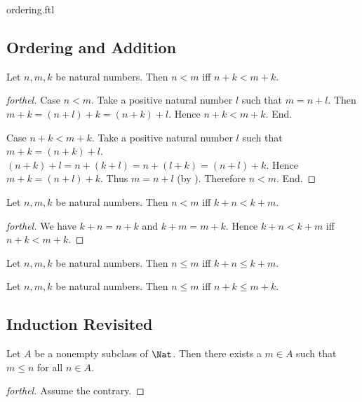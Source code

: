 \documentclass{naproche-library}
\begin{document}
\begin{smodule}{ordering.ftl}
  \subsection*{Ordering and Addition}

  \begin{proposition}[forthel,id=ARITHMETIC_04_7354062662008832]
    Let $n, m, k$ be natural numbers.
    Then $n < m$ iff $n + k < m + k$.
  \end{proposition}
  \begin{proof}[forthel]
    Case $n < m$.
      Take a positive natural number $l$ such that $m = n + l$.
      Then $m + k
        = (n + l) + k
        = (n + k) + l$.
      Hence $n + k < m + k$.
    End.

    Case $n + k < m + k$.
      Take a positive natural number $l$ such that $m + k = (n + k) + l$.
      $(n + k) + l
        = n + (k + l)
        = n + (l + k)
        = (n + l) + k$.
      Hence $m + k = (n + l) + k$.
      Thus $m = n + l$ (by ).
      Therefore $n < m$.
    End.
  \end{proof}

  \begin{corollary}[forthel,id=ARITHMETIC_04_1901366129721344]
    Let $n, m, k$ be natural numbers.
    Then $n < m$ iff $k + n < k + m$.
  \end{corollary}
  \begin{proof}[forthel]
    We have $k + n = n + k$ and $k + m = m + k$.
    Hence $k + n < k + m$ iff $n + k < m + k$.
  \end{proof}

  \begin{corollary}[forthel,id=ARITHMETIC_04_4203390999461888]
    Let $n, m, k$ be natural numbers.
    Then $n \leq m$ iff $k + n \leq k + m$.
  \end{corollary}

  \begin{corollary}[forthel,id=ARITHMETIC_04_5512590832697344]
    Let $n, m, k$ be natural numbers.
    Then $n \leq m$ iff $n + k \leq m + k$.
  \end{corollary}


  \subsection*{Induction Revisited}

  \begin{proposition}[forthel,id=ARITHMETIC_04_272317502455808]
    Let $A$ be a nonempty subclass of $\Nat$.
    Then there exists a $m \in A$ such that $m \leq n$ for all $n \in A$.
  \end{proposition}
  \begin{proof}[forthel]
    Assume the contrary.


\end{proof}
\end{smodule}
\end{document}
